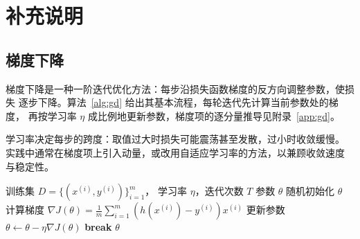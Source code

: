 \chapter{补充说明}

\section{梯度下降}

梯度下降是一种一阶迭代优化方法：每步沿损失函数梯度的反方向调整参数，使损失
逐步下降。算法~\ref{alg:gd} 给出其基本流程，每轮迭代先计算当前参数处的梯度，
再按学习率 $\eta$ 成比例地更新参数，梯度项的逐分量推导见附录~\ref{app:gd}。

学习率决定每步的跨度：取值过大时损失可能震荡甚至发散，过小时收敛缓慢。
实践中通常在梯度项上引入动量，或改用自适应学习率的方法，以兼顾收敛速度
与稳定性。

\begin{algorithm}[htbp]
  \caption{梯度下降}
  \label{alg:gd}
  \begin{algorithmic}[1]
    \Require 训练集 $D = \{(x^{(i)}, y^{(i)})\}_{i=1}^{m}$，
             学习率 $\eta$，迭代次数 $T$
    \Ensure 参数 $\theta$
    \State 随机初始化 $\theta$
      \State 计算梯度
             $\nabla J(\theta) = \frac{1}{m}\sum_{i=1}^{m}
              \left( h(x^{(i)}) - y^{(i)} \right) x^{(i)}$
      \State 更新参数 $\theta \gets \theta - \eta \nabla J(\theta)$
        \State \textbf{break}
      \EndIf
    \EndFor
    \State \Return $\theta$
  \end{algorithmic}
\end{algorithm}
